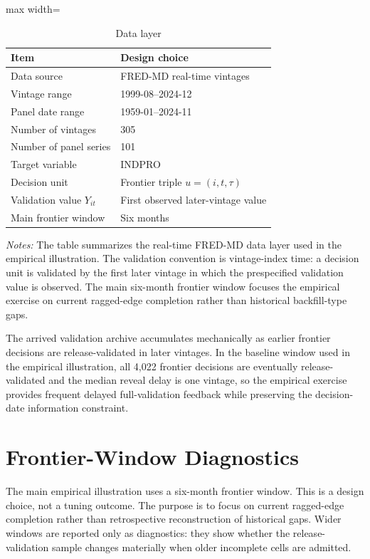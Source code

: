 \documentclass[a4paper,12pt]{article}
\newcommand{\1}{\mathbf{1}}
\newcommand{\ExhibitNote}[1]{\begin{minipage}{0.94\textwidth}\footnotesize\emph{Notes:} #1\end{minipage}}
\begin{document}
\begin{table}[H]
\centering
\caption{Data layer}
\label{tab:ia_data_layer}
\small
\begin{adjustbox}{max width=\textwidth}
\begin{tabular}{@{}ll@{}}
\toprule
Item & Design choice \\
\midrule
Data source & FRED-MD real-time vintages \\
Vintage range & 1999-08--2024-12 \\
Panel date range & 1959-01--2024-11 \\
Number of vintages & 305 \\
Number of panel series & 101 \\
Target variable & INDPRO \\
Decision unit & Frontier triple $u=(i,t,\tau)$ \\
Validation value $Y_{it}$ & First observed later-vintage value \\
Main frontier window & Six months \\
\bottomrule
\end{tabular}
\end{adjustbox}
\par\medskip
\ExhibitNote{The table summarizes the real-time FRED-MD data layer used in the empirical illustration. The validation convention is vintage-index time: a decision unit is validated by the first later vintage in which the prespecified validation value is observed. The main six-month frontier window focuses the empirical exercise on current ragged-edge completion rather than historical backfill-type gaps.}
\end{table}

The arrived validation archive accumulates mechanically as earlier frontier decisions are release-validated in later vintages. In the baseline window used in the empirical illustration, all 4,022 frontier decisions are eventually release-validated and the median reveal delay is one vintage, so the empirical exercise provides frequent delayed full-validation feedback while preserving the decision-date information constraint.

\section{Frontier-Window Diagnostics}
\label{ia:frontier_window}

The main empirical illustration uses a six-month frontier window. This is a design choice, not a tuning outcome. The purpose is to focus on current ragged-edge completion rather than retrospective reconstruction of historical gaps. Wider windows are reported only as diagnostics: they show whether the release-validation sample changes materially when older incomplete cells are admitted.
\end{document}
